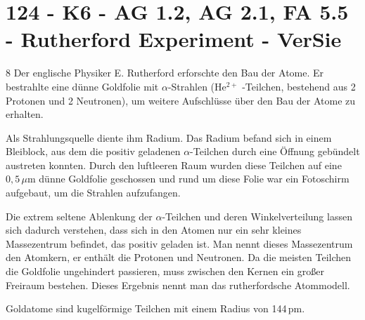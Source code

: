 \section{124 - K6 - AG 1.2, AG 2.1, FA 5.5 - Rutherford Experiment - VerSie}

\begin{langesbeispiel} \item[8] %
Der englische Physiker E. Rutherford erforschte den Bau der Atome. Er bestrahlte eine dünne Goldfolie mit $\alpha$-Strahlen (He$^{2+}$ -Teilchen, bestehend aus 2 Protonen und 2 Neutronen), um weitere Aufschlüsse über den Bau der Atome zu erhalten. 

Als Strahlungsquelle diente ihm Radium. Das Radium befand sich in einem Bleiblock, aus dem die positiv geladenen $\alpha$-Teilchen  durch eine Öffnung gebündelt austreten konnten. Durch den luftleeren Raum wurden diese Teilchen auf eine $ 0,5\, \mu$m dünne Goldfolie geschossen und rund um diese Folie war ein Fotoschirm aufgebaut, um die Strahlen aufzufangen.

Die extrem seltene Ablenkung der $\alpha$-Teilchen und deren Winkelverteilung lassen sich dadurch verstehen, dass sich in den Atomen nur ein sehr kleines Massezentrum befindet, das positiv geladen ist. Man nennt dieses Massezentrum den Atomkern, er enthält die Protonen und Neutronen. Da die meisten Teilchen die Goldfolie ungehindert passieren, muss zwischen den Kernen ein großer Freiraum bestehen. Dieses Ergebnis nennt man das rutherfordsche Atommodell.%

\begin{aufgabenstellung}
\item Goldatome sind kugelförmige Teilchen mit einem Radius von  144\,pm.%



\end{aufgabenstellung}
\end{langesbeispiel}
